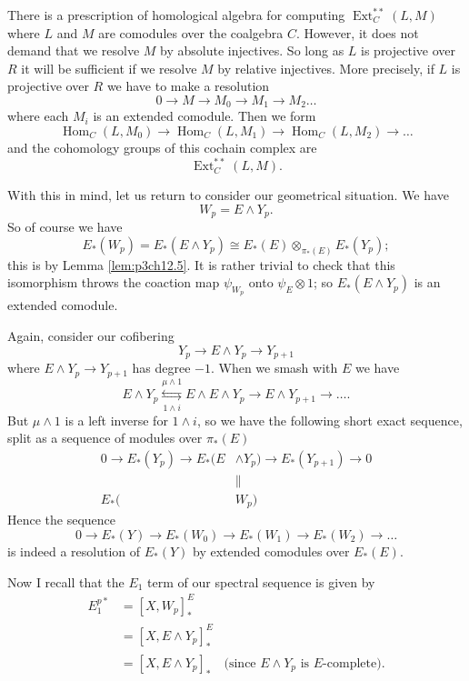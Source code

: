 \documentclass[../main]{subfiles}
\begin{document}
\par There is a prescription of homological algebra for computing $\operatorname{Ext}_C^{\ast\ast}(L,M)$ where $L$ and $M$ are comodules over the coalgebra $C$. However, it does not demand that we resolve $M$ by absolute injectives. So long as $L$ is projective over $R$ it will be sufficient if we resolve $M$ by relative injectives. More precisely, if $L$ is projective over $R$ we have to make a resolution 
$$0\longrightarrow M \longrightarrow M_0 \longrightarrow M_1 \longrightarrow M_2 \hdots$$
where each $M_i$ is an extended comodule. Then we form 
$$\operatorname{Hom}_C(L,M_0)\longrightarrow \operatorname{Hom}_C(L,M_1)\longrightarrow\operatorname{Hom}_C(L,M_2)\longrightarrow \hdots $$
and the cohomology groups of this cochain complex are 
$$\operatorname{Ext}_C^{\ast\ast}(L,M).$$

\par With this in mind, let us return to consider our geometrical situation. We have 
$$W_p=E\wedge Y_p.$$
So of course we have 
$$E_\ast(W_p)=E_\ast(E\wedge Y_p)\cong E_\ast(E)\otimes_{\pi_\ast(E)}E_\ast(Y_p);$$
this is by Lemma \ref{lem:p3ch12.5}. It is rather trivial to check that this isomorphism throws the coaction map $\psi_{W_p}$ onto $\psi_E\otimes 1$; so $E_\ast(E\wedge Y_p)$ is an extended comodule.

Again, consider our cofibering
$$Y_p\longrightarrow E\wedge Y_p\longrightarrow Y_{p+1}$$
where $E\wedge Y_p\longrightarrow Y_{p+1}$ has degree $-1$. When we smash with $E$ we have 
$$E\wedge Y_p \overset{\mu\wedge 1}{\underset{1\wedge i}{\leftrightarrows}} E\wedge E\wedge Y_p \longrightarrow E\wedge Y_{p+1}\longrightarrow \hdots.$$
But $\mu\wedge 1$ is a left inverse for $1\wedge i$, so we have the following short exact sequence, split as a sequence of modules over $\pi_\ast(E)$
\begin{align} 0\longrightarrow E_\ast(Y_p) \longrightarrow E_\ast(E&\wedge Y_p)\longrightarrow E_\ast(Y_{p+1}) \longrightarrow 0 \nonumber \\ 
&\| \nonumber\\
E_\ast(&W_p) \nonumber
\end{align}
Hence the sequence
$$0\longrightarrow E_\ast(Y)\longrightarrow E_\ast(W_0) \longrightarrow E_\ast(W_1) \longrightarrow E_\ast(W_2) \longrightarrow \hdots$$
is indeed a resolution of $E_\ast(Y)$ by extended comodules over $E_\ast(E)$.

Now I recall that the $E_1$ term of our spectral sequence is given by 
\begin{align}
    E_1^{p\ast} &= [X,W_p]_\ast^E \nonumber \\
    &= [X, E\wedge Y_p]_\ast^E \nonumber \\
    &=[X,E\wedge Y_p]_\ast \quad \text{(since } E\wedge Y_p \text{ is } E\text{-complete).} \nonumber
\end{align}
\end{document}
